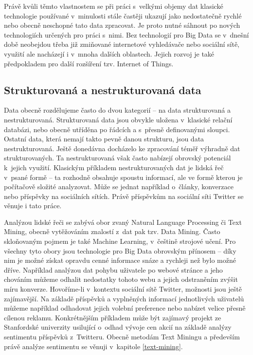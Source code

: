 \documentclass[thesis=B,czech]{FITthesis}[2012/06/26]
\begin{document}
	Právě kvůli těmto vlastnostem se při práci s~velkými objemy dat klasické technologie používané v~minulosti stále častěji ukazují jako nedostatečně rychlé nebo obecně neschopné tato data zpracovat. Je proto nutné sáhnout po nových technologiích určených pro práci s~nimi. Bez technologií pro Big Data se v~dnešní době neobejdou třeba již zmiňované internetové vyhledávače nebo sociální sítě, využití ale nacházejí i v~mnoha dalších oblastech. Jejich rozvoj je také předpokladem pro další rozšíření tzv. Internet of Things\cite{bigdata-iot}.  

\subsection{Strukturovaná a nestrukturovaná data}	
	Data obecně rozdělujeme často do dvou kategorií -- na data strukturovaná a nestrukturovaná. Strukturovaná data jsou obvykle uložena v~klasické relační databázi, nebo obecně utříděna po řádcích a s~přesně definovanými sloupci. Ostatní data, která nemají takto pevně danou strukturu, jsou data nestrukturovaná. Ještě donedávna docházelo ke zpracování téměř výhradně dat strukturovaných. Ta nestrukturovaná však často nabízejí obrovský potenciál k~jejich využití. Klasickým příkladem nestrukturovaných dat je lidská řeč v~psané formě -- ta rozhodně obsahuje spoustu informací, ale ve formě kterou je počítačově složité analyzovat. Může se jednat například o~články, konverzace nebo příspěvky na sociálních sítích.  Právě příspěvkům na sociální síti Twitter se věnuje i tato práce. 
	
	Analýzou lidské řeči se zabývá obor zvaný Natural Language Processing či Text Mining, obecně vytěžováním znalostí z~dat pak tzv. Data Mining. Často skloňovaným pojmem je také Machine Learning, v~češtině strojové učení. Pro všechny tyto obory jsou technologie pro Big Data obrovským přínosem -- díky nim je možné získat opravdu cenné informace snáze a rychleji než bylo možné dříve. Například analýzou dat pohybu uživatele po webové stránce a jeho chováním můžeme odhalit nedostatky tohoto webu a jejich odstraněním zvýšit míru konverze. Hovoříme-li v~kontextu sociální sítě Twitter, možnosti jsou ještě zajímavější. Na základě příspěvků a vyplněných informací jednotlivých uživatelů můžeme například odhadovat jejich volební preference nebo nabízet velice přesně cílenou reklamu. Konkrétnějším příkladem může být zajímavý projekt ze Stanfordské univerzity usilující o~odhad vývoje cen akcií na základě analýzy sentimentu příspěvků z~Twitteru\cite{stock-stanford}. Obecně metodám Text Miningu a především právě analýze sentimentu se věnuji v~kapitole \ref{text-mining}.  
\end{document}
